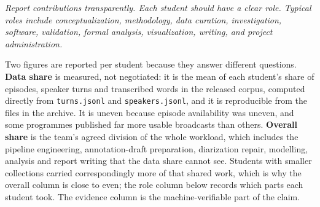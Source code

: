\documentclass[11pt,a4paper]{article}
\begin{document}
\emph{\small Report contributions transparently. Each student should have a clear role. Typical
roles include conceptualization, methodology, data curation, investigation, software, validation,
formal analysis, visualization, writing, and project administration.}

\vspace{2pt}
Two figures are reported per student because they answer different questions. \textbf{Data share}
is measured, not negotiated: it is the mean of each student's share of episodes, speaker turns and
transcribed words in the released corpus, computed directly from \texttt{turns.jsonl} and
\texttt{speakers.jsonl}, and it is reproducible from the files in the archive. It is uneven because
episode availability was uneven, and some programmes published far more usable broadcasts
than others. \textbf{Overall share} is the team's agreed division of the whole workload, which includes
the pipeline engineering, annotation-draft preparation, diarization repair, modelling, analysis
and report writing that the data share cannot see. Students with smaller collections carried
correspondingly more of that shared work, which is why the overall column is close to even; the
role column below records which parts each student took. The evidence column is the
machine-verifiable part of the claim.
\end{document}
